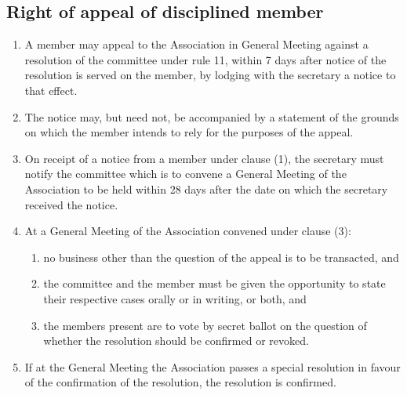 \subsection{Right of appeal of disciplined member}
\begin{enumerate}
  \item A member may appeal to the Association in General Meeting against a resolution of the committee under rule 11, within 7 days after notice of the resolution is served on the member, by lodging with the secretary a notice to that effect.
  \item The notice may, but need not, be accompanied by a statement of the grounds on which the member intends to rely for the purposes of the appeal.
  \item On receipt of a notice from a member under clause (1), the secretary must notify the committee which is to convene a General Meeting of the Association to be held within 28 days after the date on which the secretary received the notice.
  \item At a General Meeting of the Association convened under clause (3):
    \begin{enumerate}
      \item no business other than the question of the appeal is to be transacted, and
      \item the committee and the member must be given the opportunity to state their respective cases orally or in writing, or both, and
      \item the members present are to vote by secret ballot on the question of whether the resolution should be confirmed or revoked.
    \end{enumerate}
  \item If at the General Meeting the Association passes a special resolution in favour of the confirmation of the resolution, the resolution is confirmed.
\end{enumerate}
